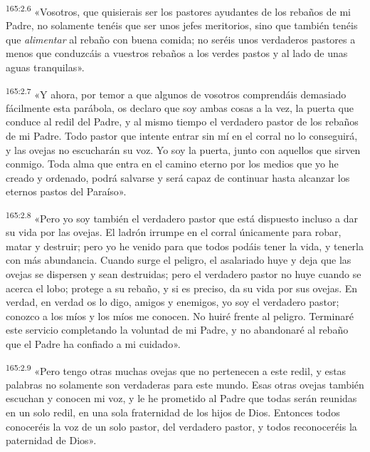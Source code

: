 \par 
\textsuperscript{165:2.6} «Vosotros, que quisierais ser los pastores ayudantes de los rebaños de mi Padre, no solamente tenéis que ser unos jefes meritorios, sino que también tenéis que \textit{alimentar} al rebaño con buena comida; no seréis unos verdaderos pastores a menos que conduzcáis a vuestros rebaños a los verdes pastos y al lado de unas aguas tranquilas».

\par 
\textsuperscript{165:2.7} «Y ahora, por temor a que algunos de vosotros comprendáis demasiado fácilmente esta parábola, os declaro que soy ambas cosas a la vez, la puerta que conduce al redil del Padre, y al mismo tiempo el verdadero pastor de los rebaños de mi Padre. Todo pastor que intente entrar sin mí en el corral no lo conseguirá, y las ovejas no escucharán su voz. Yo soy la puerta, junto con aquellos que sirven conmigo. Toda alma que entra en el camino eterno por los medios que yo he creado y ordenado, podrá salvarse y será capaz de continuar hasta alcanzar los eternos pastos del Paraíso».

\par 
\textsuperscript{165:2.8} «Pero yo soy también el verdadero pastor que está dispuesto incluso a dar su vida por las ovejas. El ladrón irrumpe en el corral únicamente para robar, matar y destruir; pero yo he venido para que todos podáis tener la vida, y tenerla con más abundancia. Cuando surge el peligro, el asalariado huye y deja que las ovejas se dispersen y sean destruidas; pero el verdadero pastor no huye cuando se acerca el lobo; protege a su rebaño, y si es preciso, da su vida por sus ovejas. En verdad, en verdad os lo digo, amigos y enemigos, yo soy el verdadero pastor; conozco a los míos y los míos me conocen. No huiré frente al peligro. Terminaré este servicio completando la voluntad de mi Padre, y no abandonaré al rebaño que el Padre ha confiado a mi cuidado».

\par 
\textsuperscript{165:2.9} «Pero tengo otras muchas ovejas que no pertenecen a este redil, y estas palabras no solamente son verdaderas para este mundo. Esas otras ovejas también escuchan y conocen mi voz, y le he prometido al Padre que todas serán reunidas en un solo redil, en una sola fraternidad de los hijos de Dios. Entonces todos conoceréis la voz de un solo pastor, del verdadero pastor, y todos reconoceréis la paternidad de Dios».

